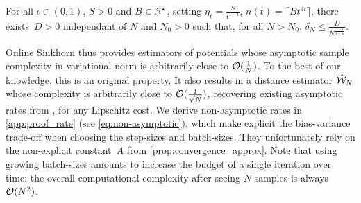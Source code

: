 \begin{proposition}\label{prop:rate}
    For all $\iota \in (0, 1)$, $S > 0$ and $B \in \mathbb{N}^\star$, setting $\eta_t =
    \frac{S}{t^{1 - \iota}}$, $n(t) = \lceil B t^{4\iota} \rceil$, there
    exists~$D > 0$ independant of $N$ and $N_0 > 0$ such that, for all $N >
    N_0$, $\delta_N \leq \frac{D}{N^{\frac{1 - \iota}{1 + 4 \iota}}}$.
\end{proposition}

Online Sinkhorn thus provides estimators of potentials whose asymptotic sample
complexity in variational norm is arbitrarily close to $\mathcal{O}(\frac{1}{N})$. To
the best of our knowledge, this is an original property. It also results in a distance estimator $\hat {\mathcal{W}}_N$ whose
complexity is arbitrarily close to $\mathcal{O}(\frac{1}{\sqrt{N}})$, recovering
existing asymptotic rates from \cite{2019-Genevay-aistats}, for any Lipschitz cost. We derive non-asymptotic rates in \autoref{app:proof_rate} (see \eqref{eq:non-asymptotic}), which make explicit the
bias-variance trade-off when choosing the step-sizes and batch-sizes. They
unfortunately rely on the non-explicit constant~$A$ from
\autoref{prop:convergence_approx}. Note that using growing batch-sizes amounts
to increase the budget of a single iteration over time: the overall
computational complexity after seeing $N$ samples is always $\mathcal{O}(N^2)$.



